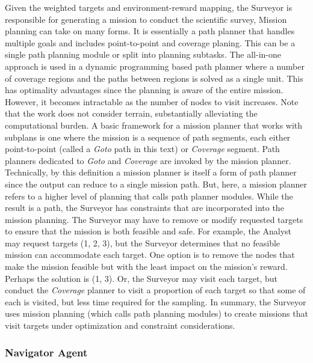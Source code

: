\documentclass{tamuccthesis}
\begin{document}
Given the weighted targets and environment-reward mapping, the Surveyor is responsible for generating a mission to conduct the scientific survey, Mission planning can take on many forms. It is essentially a path planner that handles multiple goals and includes point-to-point and coverage planing. This can be a single path planning module or split into planning subtasks. The all-in-one approach is used in a dynamic programming based path planner where a number of coverage regions and the paths between regions is solved as a single unit. This has optimality advantages since the planning is aware of the entire mission. However, it becomes intractable as the number of nodes to visit increases. Note that the work does not consider terrain, substantially alleviating the computational burden. A basic framework for a mission planner that works with subplans is one where the mission is a sequence of path segments, each either point-to-point (called a \textit{Goto} path in this text) or \textit{Coverage} segment. Path planners dedicated to \textit{Goto} and \textit{Coverage} are invoked by the mission planner. Technically, by this definition a mission planner is itself a form of path planner since the output can reduce to a single mission path. But, here, a mission planner refers to a higher level of planning that calls path planner modules. While the result is a path, the Surveyor has constraints that are incorporated into the mission planning. The Surveyor may have to remove or modify requested targets to ensure that the mission is both feasible and safe. For example, the Analyst may request targets (1, 2, 3), but the Surveyor determines that no feasible mission can accommodate each target. One option is to remove the nodes that make the mission feasible but with the least impact on the mission's reward. Perhaps the solution is (1, 3). Or, the Surveyor may visit each target, but conduct the \textit{Coverage} planner to visit a proportion of each target so that some of each is visited, but less time required for the sampling. In summary, the Surveyor uses mission planning (which calls path planning modules) to create missions that visit targets under optimization and constraint considerations. 

\subsubsection{Navigator Agent}
\end{document}
